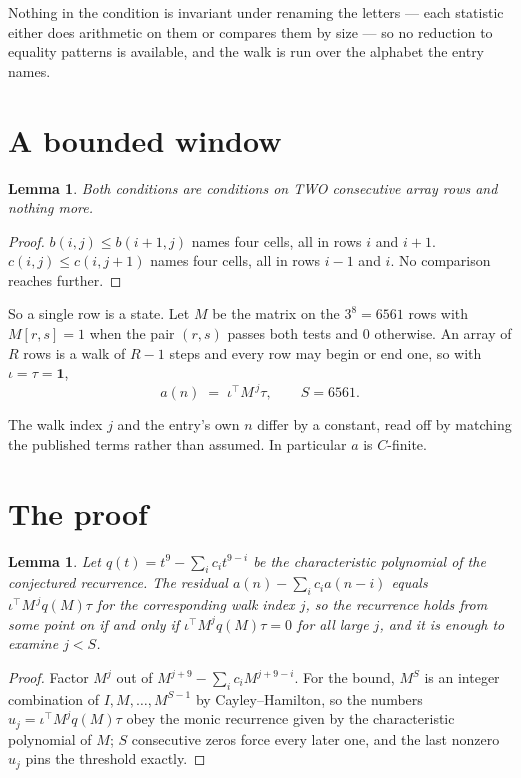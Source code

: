 \documentclass[11pt,a4paper]{article}
\theoremstyle{plain}
\newtheorem{lemma}[theorem]{Lemma}
\theoremstyle{definition}
\begin{document}
Nothing in the condition is invariant under renaming the letters --- each statistic either does
arithmetic on them or compares them by size --- so no reduction to equality patterns is
available, and the walk is run over the alphabet the entry names.

\section{A bounded window}

\begin{lemma}\label{lem:win}
Both conditions are conditions on TWO consecutive array rows and nothing more.
\end{lemma}

\begin{proof}
$b(i,j)\le b(i{+}1,j)$ names four cells, all in rows $i$ and $i+1$. $c(i,j)\le c(i,j{+}1)$
names four cells, all in rows $i-1$ and $i$. No comparison reaches further.
\end{proof}

So a single row is a state. Let $M$ be the matrix on the $3^{8}=6561$ rows with
$M[r,s]=1$ when the pair $(r,s)$ passes both tests and $0$ otherwise. An array of $R$ rows is a
walk of $R-1$ steps and every row may begin or end one, so with $\iota=\tau=\mathbf{1}$,
\[
a(n)\;=\;\iota^{\!\top}M^{\,j}\tau ,\qquad S=6561.
\]

The walk index $j$ and the entry's own $n$ differ by a constant, read off by matching the
published terms rather than assumed. In particular $a$ is $C$-finite.

\section{The proof}

\begin{lemma}\label{lem:crit}
Let $q(t)=t^{9}-\sum_i c_it^{9-i}$ be the characteristic polynomial of the
conjectured recurrence. The residual $a(n)-\sum_ic_ia(n-i)$ equals
$\iota^{\!\top}M^{\,j}q(M)\tau$ for the corresponding walk index $j$, so the recurrence
holds from some point on if and only if $\iota^{\!\top}M^{j}q(M)\tau=0$ for all large $j$,
and it is enough to examine $j<S$.
\end{lemma}

\begin{proof}
Factor $M^{j}$ out of $M^{j+9}-\sum_ic_iM^{j+9-i}$. For the bound, $M^{S}$
is an integer combination of $I,M,\dots,M^{S-1}$ by Cayley--Hamilton, so the numbers
$u_j=\iota^{\!\top}M^{j}q(M)\tau$ obey the monic recurrence given by the characteristic
polynomial of $M$; $S$ consecutive zeros force every later one, and the last nonzero $u_j$
pins the threshold exactly.
\end{proof}
\end{document}
